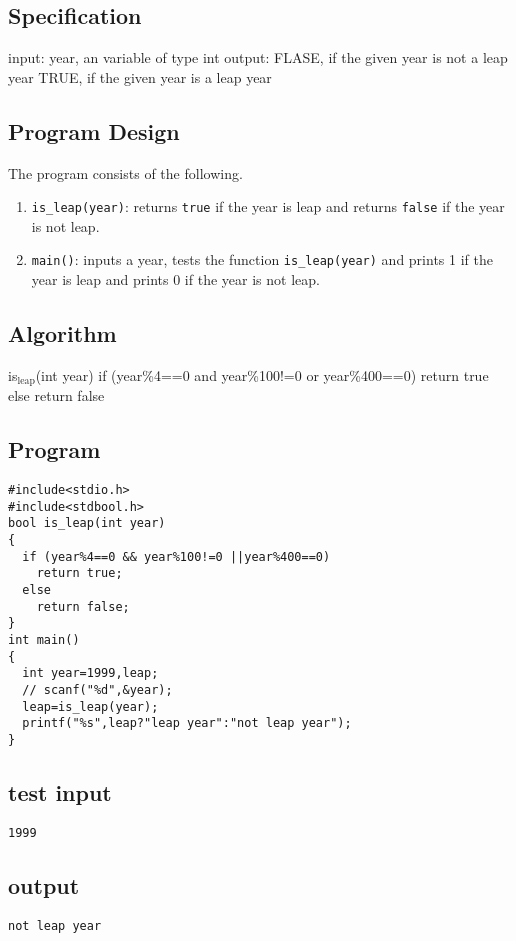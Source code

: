 \documentclass[11pt]{article}
\begin{document}
\subsection*{Specification}
\label{sec-4-2}
input: year, an variable of type int
output: FLASE, if the given year is not a leap year
        TRUE, if the given year is a leap year

\subsection*{Program Design}
\label{sec-4-3}
The program consists of the following.
\begin{enumerate}
\item \texttt{is\_leap(year)}: returns \texttt{true} if the year is leap and returns \texttt{false} if the year is not leap.
\item \texttt{main()}: inputs a year, tests the function \texttt{is\_leap(year)} and prints 1 if the year is leap and prints 0 if the year is not leap.
\end{enumerate}

\subsection*{Algorithm}
\label{sec-4-4}
is$_{\text{leap}}$(int year)
     if (year\%4==0 and year\%100!=0 or year\%400==0)
          return true
     else
          return false

\subsection*{Program}
\label{sec-4-5}
\begin{verbatim}
#include<stdio.h>
#include<stdbool.h>
bool is_leap(int year)
{
  if (year%4==0 && year%100!=0 ||year%400==0)
    return true;
  else
    return false;
}
int main()
{
  int year=1999,leap;
  // scanf("%d",&year);
  leap=is_leap(year);
  printf("%s",leap?"leap year":"not leap year");
}
\end{verbatim}
\subsection*{test input}
\label{sec-4-6}
\begin{verbatim}
1999
\end{verbatim}
\subsection*{output}
\label{sec-4-7}
\begin{verbatim}
not leap year
\end{verbatim}
\end{document}
